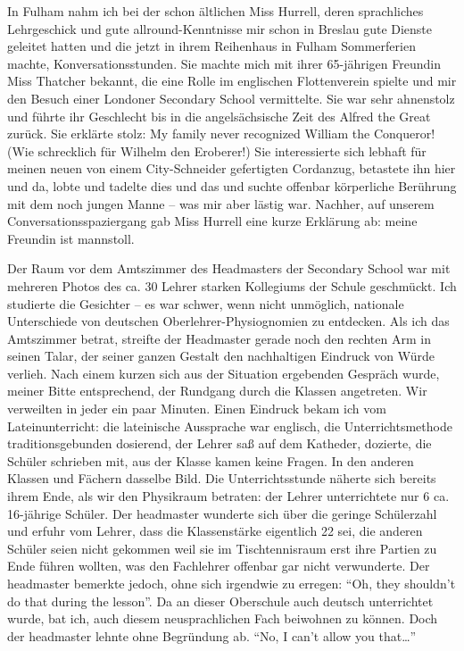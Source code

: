 \documentclass[a5paper,pagesize,10pt,twoside=true]{scrbook}
\renewcommand{\marginpar}[2][]{}
\begin{document}
In Fulham nahm ich bei der schon ältlichen Miss Hurrell, deren sprachliches Lehrgeschick und gute allround-Kenntnisse mir schon in Breslau gute Dienste geleitet hatten und die jetzt in ihrem Reihenhaus in Fulham Sommerferien machte, Konversationsstunden. Sie machte mich mit ihrer 65-jährigen Freundin Miss Thatcher bekannt, die eine Rolle im englischen Flottenverein spielte und mir den Besuch einer Londoner Secondary School vermittelte. Sie war sehr ahnenstolz und führte ihr Geschlecht bis in die angelsächsische Zeit des Alfred the Great zurück. Sie erklärte stolz: My family never recognized William the Conqueror! (Wie schrecklich für Wilhelm den Eroberer!) Sie interessierte sich lebhaft für meinen neuen von einem City-Schneider gefertigten Cordanzug, betastete ihn hier und da, lobte und tadelte dies und das und suchte offenbar körperliche Berührung mit dem noch jungen Manne -- was mir aber lästig war. Nachher, auf unserem Conversationsspaziergang gab Miss Hurrell eine kurze Erklärung ab: meine Freundin ist manns\-toll.

Der Raum vor dem Amtszimmer des Headmasters der Secondary School war mit mehreren Photos des ca. 30 Lehrer starken Kollegiums der Schule geschmückt. Ich studierte die Gesichter -- es war schwer, wenn nicht unmöglich, nationale Unterschiede von deutschen Oberlehrer-Physiognomien zu entdecken. Als ich das Amtszimmer betrat, streifte der Headmaster gerade noch den rechten Arm in seinen Talar, der seiner ganzen Gestalt den nachhaltigen Eindruck von Würde verlieh. Nach \marginpar{483} einem kurzen sich aus der Situation ergebenden Gespräch wurde, meiner Bitte entsprechend, der Rundgang durch die Klassen angetreten. Wir verweilten in jeder ein paar Minuten. Einen Eindruck bekam ich vom Lateinunterricht: die lateinische Aussprache war englisch, die Unterrichtsmethode traditionsgebunden dosierend, der Lehrer saß auf dem Katheder, dozierte, die Schüler schrieben mit, aus der Klasse kamen keine Fragen. In den anderen Klassen und Fächern dasselbe Bild. Die Unterrichtsstunde näherte sich bereits ihrem Ende, als wir den Physikraum betraten: der Lehrer unterrichtete nur 6 ca. 16-jährige Schüler. Der headmaster wunderte sich über die geringe Schülerzahl und erfuhr vom Lehrer, dass die Klassenstärke eigentlich 22 sei, die anderen Schüler seien nicht gekommen weil sie im Tischtennisraum erst ihre Partien zu Ende führen wollten, was den Fachlehrer offenbar gar nicht verwunderte. Der headmaster bemerkte jedoch, ohne sich irgendwie zu erregen: \enquote{Oh, they shouldn't do that during the lesson}. Da an dieser Oberschule auch deutsch unterrichtet wurde, bat ich, auch diesem neusprachlichen Fach beiwohnen zu können. Doch der headmaster lehnte ohne Begründung ab. \enquote{No, I can't allow you that\dots}
\end{document}
